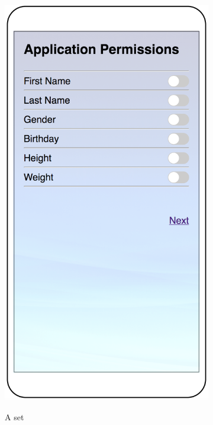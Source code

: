 \begin{figure}
	\centering
	\begin{subfigure}[b]{0.24\textheight}
		\includegraphics[width=0.24\textheight]{figures/manual1.png}
		\label{fig:manuala}
		\caption{A set}
	\end{subfigure}
	\begin{subfigure}[b]{0.24\textheight}

\end{subfigure}
\end{figure}
